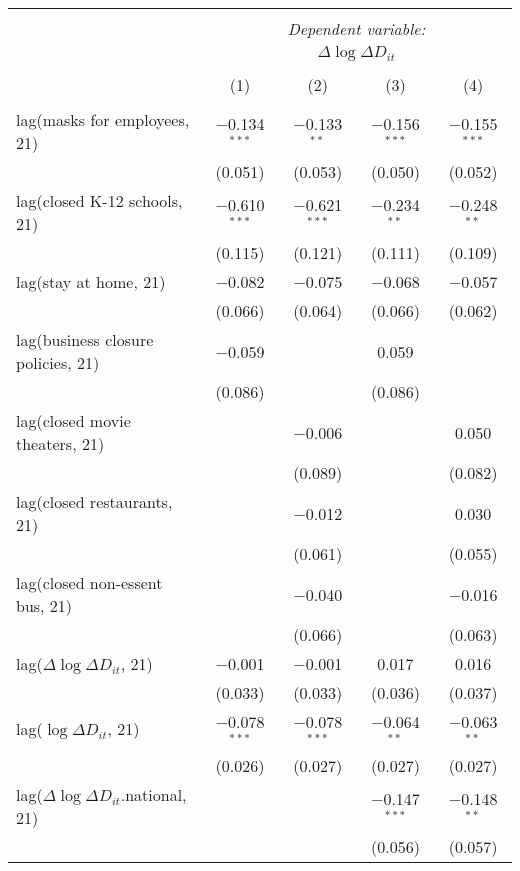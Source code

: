 \begin{tabular}{@{\extracolsep{1pt}}lcccc} 
\\[-1.8ex]\hline 
\hline \\[-1.8ex] 
 & \multicolumn{4}{c}{\textit{Dependent variable:}} \\ 
\cline{2-5} 
 & \multicolumn{4}{c}{$\Delta \log \Delta D_{it}$} \\ 
\\[-1.8ex] & (1) & (2) & (3) & (4)\\ 
\hline \\[-1.8ex] 
 lag(masks for employees, 21) & $-$0.134$^{***}$ & $-$0.133$^{**}$ & $-$0.156$^{***}$ & $-$0.155$^{***}$ \\ 
  & (0.051) & (0.053) & (0.050) & (0.052) \\ 
  lag(closed K-12 schools, 21) & $-$0.610$^{***}$ & $-$0.621$^{***}$ & $-$0.234$^{**}$ & $-$0.248$^{**}$ \\ 
  & (0.115) & (0.121) & (0.111) & (0.109) \\ 
  lag(stay at home, 21) & $-$0.082 & $-$0.075 & $-$0.068 & $-$0.057 \\ 
  & (0.066) & (0.064) & (0.066) & (0.062) \\ 
  lag(business closure policies, 21) & $-$0.059 &  & 0.059 &  \\ 
  & (0.086) &  & (0.086) &  \\ 
  lag(closed movie theaters, 21) &  & $-$0.006 &  & 0.050 \\ 
  &  & (0.089) &  & (0.082) \\ 
  lag(closed restaurants, 21) &  & $-$0.012 &  & 0.030 \\ 
  &  & (0.061) &  & (0.055) \\ 
  lag(closed non-essent bus, 21) &  & $-$0.040 &  & $-$0.016 \\ 
  &  & (0.066) &  & (0.063) \\ 
  lag($\Delta \log \Delta D_{it}$, 21) & $-$0.001 & $-$0.001 & 0.017 & 0.016 \\ 
  & (0.033) & (0.033) & (0.036) & (0.037) \\ 
  lag($\log \Delta D_{it}$, 21) & $-$0.078$^{***}$ & $-$0.078$^{***}$ & $-$0.064$^{**}$ & $-$0.063$^{**}$ \\ 
  & (0.026) & (0.027) & (0.027) & (0.027) \\ 
  lag($\Delta \log \Delta D_{it}$.national, 21) &  &  & $-$0.147$^{***}$ & $-$0.148$^{**}$ \\ 
  &  &  & (0.056) & (0.057) \\ 

\end{tabular}
